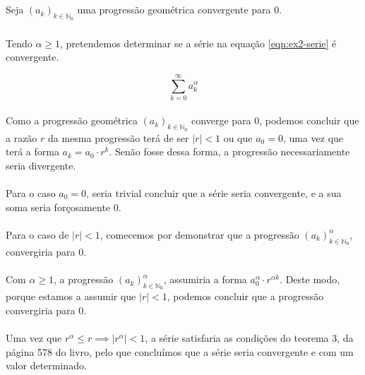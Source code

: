 \subsection{}

Seja $\left(a_k\right)_{k \in \mathbb{N}_0}$ uma progressão geométrica
convergente para 0.

\subsubsection{}

Tendo $\alpha \geq 1$, pretendemos determinar se a série na equação
\ref{eqn:ex2-serie} é convergente.

\begin{equation}
\label{eqn:ex2-serie}
	\sum^{\infty}_{k=0} a_k^{\alpha}
\end{equation}

\paragraph{} Como a progressão geométrica
$\left(a_k\right)_{k \in \mathbb{N}_0}$ converge para 0, podemos concluir que
a razão $r$ da mesma progressão terá de ser $|r| < 1$ ou que $a_0 = 0$, uma
vez que terá a forma $a_k = a_0 \cdot r^k$. Senão fosse dessa forma, a
progressão necessariamente seria divergente.

\paragraph{} Para o caso $a_0 = 0$, seria trivial concluir que a série seria
convergente, e a sua soma seria forçosamente 0.

\paragraph{} Para o caso de $|r| < 1$, comecemos por demonstrar que a
progressão $\left(a_k\right)^{\alpha}_{k \in \mathbb{N}_0}$, convergiria para
0.

\paragraph{} Com $\alpha \geq 1$, a progressão
$\left(a_k\right)^{\alpha}_{k \in \mathbb{N}_0}$, assumiria a forma
$ a_0^{\alpha} \cdot r^{\alpha k}$. Deste modo, porque estamos a assumir que
$|r| < 1$, podemos concluir que a progressão convergiria para 0.

\paragraph{} Uma vez que $r^{\alpha} \leq r \implies |r^\alpha| < 1$, a
série satisfaria as condições do teorema 3, da página 578 do
livro\cite{santos2016calculo}, pelo que concluímos que a série seria
convergente e com um valor determinado.

